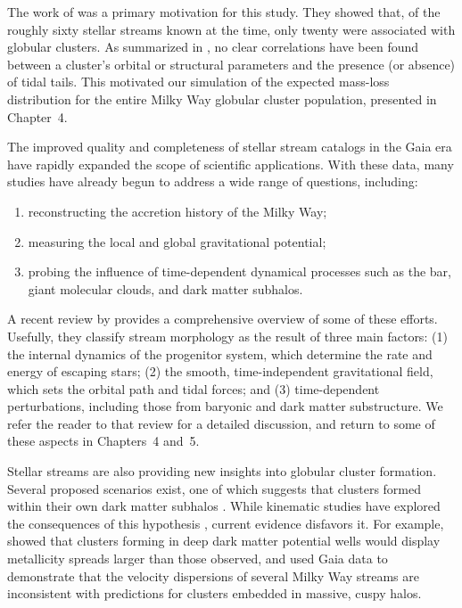     The work of \citet{2021ApJ...914..123I} was a primary motivation for this study. They showed that, of the roughly sixty stellar streams known at the time, only twenty were associated with globular clusters.  As summarized in \citet{2020A&A...637L...2P}, no clear correlations have been found between a cluster's orbital or structural parameters and the presence (or absence) of tidal tails. This motivated our simulation of the expected mass-loss distribution for the entire Milky Way globular cluster population, presented in Chapter~4.

    The improved quality and completeness of stellar stream catalogs in the Gaia era have rapidly expanded the scope of scientific applications. With these data, many studies have already begun to address a wide range of questions, including:  
    \begin{enumerate}
        \item reconstructing the accretion history of the Milky Way;
        \item measuring the local and global gravitational potential;
        \item probing the influence of time-dependent dynamical processes such as the bar, giant molecular clouds, and dark matter subhalos.
    \end{enumerate}
    A recent review by \citet{2025NewAR.10001713B} provides a comprehensive overview of some of these efforts. Usefully, they classify stream morphology as the result of three main factors: (1) the internal dynamics of the progenitor system, which determine the rate and energy of escaping stars; (2) the smooth, time-independent gravitational field, which sets the orbital path and tidal forces; and (3) time-dependent perturbations, including those from baryonic and dark matter substructure. We refer the reader to that review for a detailed discussion, and return to some of these aspects in Chapters~4 and~5.

    Stellar streams are also providing new insights into globular cluster formation. Several proposed scenarios exist, one of which suggests that clusters formed within their own dark matter subhalos \citep{2025arXiv250116438K}. While kinematic studies have explored the consequences of this hypothesis \citep{2022A&A...667A.112V}, current evidence disfavors it. For example, \citet{2016ApJ...823...52K} showed that clusters forming in deep dark matter potential wells would display metallicity spreads larger than those observed, and \citet{2022ApJ...941L..38M} used Gaia data to demonstrate that the velocity dispersions of several Milky Way streams are inconsistent with predictions for clusters embedded in massive, cuspy halos.

